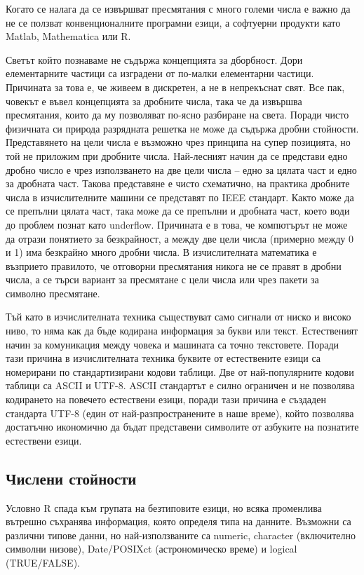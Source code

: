 Когато се налага да се извършват пресмятания с много големи числа е важно да не се ползват конвенционалните програмни езици, а софтуерни продукти като Matlab, Mathematica или R. 

Светът който познаваме не съдържа концепцията за дборбност. Дори елементарните частици са изградени от по-малки елементарни частици. Причината за това е, че живеем в дискретен, а не в непрекъснат свят. Все пак, човекът е въвел концепцията за дробните числа, така че да извършва пресмятания, които да му позволяват по-ясно разбиране на света. Поради чисто физичната си природа разрядната решетка не може да съдържа дробни стойности. Представянето на цели числа е възможно чрез принципа на супер позицията, но той не приложим при дробните числа. Най-лесният начин да се представи едно дробно число е чрез използването на две цели числа – едно за цялата част и едно за дробната част. Такова представяне е чисто схематично, на практика дробните числа в изчислителните машини се представят по IEEE стандарт. Както може да се препълни цялата част, така може да се препълни и дробната част, което води до проблем познат като underflow. Причината е в това, че компютърът не може да отрази понятието за безкрайност, а между две цели числа (примерно между 0 и 1) има безкрайно много дробни числа. В изчислителната математика е възприето правилото, че отговорни пресмятания никога не се правят в дробни числа, а се търси вариант за пресмятане с цели числа или чрез пакети за символно пресмятане. 

Тъй като в изчислителната техника съществуват само сигнали от ниско и високо ниво, то няма как да бъде кодирана информация за букви или текст. Естественият начин за комуникация между човека и машината са точно текстовете. Поради тази причина в изчислителната техника буквите от естествените езици са номерирани по стандартизирани кодови таблици. Две от най-популярните кодови таблици са ASCII и UTF-8. ASCII стандартът е силно ограничен и не позволява кодирането на повечето естествени езици, поради тази причина е създаден стандарта UTF-8 (един от най-разпространените в наше време), който позволява достатъчно икономично да бъдат представени символите от азбуките на познатите естествени езици. 

\subsection{Числени стойности}

Условно R спада към групата на безтиповите езици, но всяка променлива вътрешно съхранява информация, която определя типа на данните. Възможни са различни типове данни, но най-използваните са numeric, character (включително символни низове), Date/POSIXct (астрономическо време) и logical (TRUE/FALSE). 


